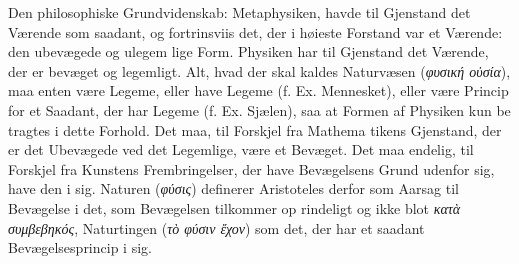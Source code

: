 \documentclass[12pt,a4paper]{book}
\newcommand{\gk}[1]{\textit{#1}}
\begin{document}
Den philosophiske Grundvidenskab: Metaphysiken, havde
til Gjenstand det Værende som saadant, og fortrinsviis det, der
i høieste Forstand var et Værende: den ubevægede og ulegem\-%
lige Form. Physiken har til Gjenstand det Værende, der er
bevæget og legemligt. Alt, hvad der skal kaldes Naturvæsen
(\gk{φυσική οὐσία}), maa enten være Legeme, eller have Legeme
(f. Ex. Mennesket), eller være Princip for et Saadant, der har
Legeme (f. Ex. Sjælen), saa at Formen af Physiken kun be\-%
tragtes i dette Forhold. Det maa, til Forskjel fra Mathema\-%
tikens Gjenstand, der er det Ubevægede ved det Legemlige,
være et Bevæget. Det maa endelig, til Forskjel fra Kunstens
Frembringelser, der have Bevægelsens Grund udenfor sig, have
den i sig. Naturen (\gk{φύσις}) definerer Aristoteles derfor som
Aarsag til Bevægelse i det, som Bevægelsen tilkommer op\-%
rindeligt og ikke blot \gk{κατὰ συμβεβηκός}, Naturtingen (\gk{τὸ φύσιν
ἔχον}) som det, der har et saadant Bevægelsesprincip i sig.
\end{document}

